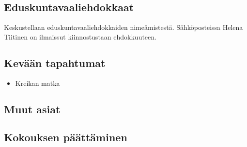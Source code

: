 \documentclass[a4paper,12pt]{article}
\begin{document}
\subsection{Eduskuntavaaliehdokkaat}
Keskustellaan eduskuntavaaliehdokkaiden nimeämistestä. Sähköposteissa Helena Tiitinen on ilmaissut kiinnostustaan ehdokkuuteen.
\subsection{Kevään tapahtumat}
\begin{itemize}
\item{Kreikan matka}
\end{itemize}
\subsection{Muut asiat}
\subsection{Kokouksen päättäminen}
\end{document}

